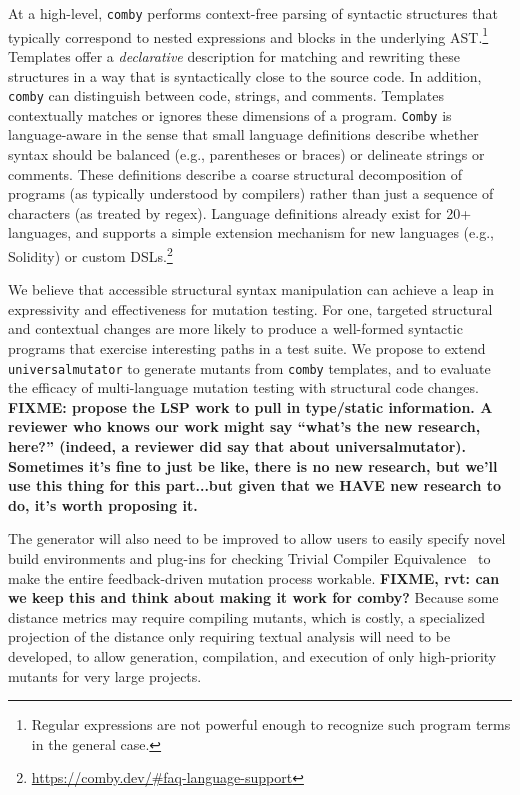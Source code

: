 At a high-level, {\tt comby} performs
context-free
parsing of syntactic structures that typically correspond to nested expressions and blocks in the underlying AST.\footnote{Regular expressions are not powerful enough to recognize such program terms in the general case.} Templates offer a \emph{declarative} description for matching and rewriting these structures in a way that is syntactically close to the source code.
In addition, {\tt comby} can distinguish between code, strings, and comments. Templates contextually matches or ignores these dimensions of a program. %
{\tt Comby} is language-aware in the sense that small language definitions describe whether syntax should be balanced (e.g., parentheses or braces) or delineate strings or comments. These definitions describe a coarse structural decomposition of programs (as typically understood by compilers) rather than just a sequence of characters (as treated by regex). Language definitions already exist for 20+ languages, and supports a simple extension mechanism for new languages (e.g., Solidity) or custom DSLs.\footnote{\url{https://comby.dev/\#faq-language-support}}

We believe that accessible structural syntax manipulation can achieve a leap in
expressivity and effectiveness for mutation testing. %
For one, targeted structural and contextual changes are
more likely to produce a well-formed syntactic programs
that exercise interesting paths in a test suite.
We propose to extend {\tt universalmutator}
to generate mutants from {\tt comby} templates, and to evaluate the efficacy of
multi-language mutation testing with structural code changes. %
\textbf{FIXME: propose the LSP work to pull in type/static information.  A
  reviewer who knows our work might say ``what's the new research, here?''
  (indeed, a reviewer did say that about universalmutator).  Sometimes it's fine
  to just be like, there is no new research, but we'll use this thing for this
  part...but given that we HAVE new research to do, it's worth proposing it.}

The generator will also need to be improved to allow users
to easily specify novel build environments and plug-ins for checking
Trivial Compiler Equivalence~\cite{TCE} to make the entire
feedback-driven mutation process workable.  \textbf{FIXME, rvt: can we keep this
  and think about making it work for comby?} Because some distance
metrics may require compiling mutants, which is costly, a specialized
projection of the distance only requiring textual analysis will need
to be developed, to allow generation, compilation, and execution of
only high-priority mutants for very large projects.


